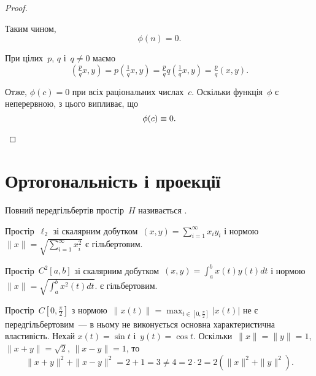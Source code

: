 \begin{proof}
\begin{enumerate}
Таким чином,
\begin{equation*}
    \phi(n) = 0.
\end{equation*}

При цілих~$p$, $q$ і~$q \ne 0$ маємо
\begin{equation*}
    \left( \tfrac{p}{q} x, y \right) =
    p \left( \tfrac{1}{q} x, y \right) =
    \tfrac{p}{q} q \left( \tfrac{1}{q} x, y \right) =
    \tfrac{p}{q} (x, y).
\end{equation*}

Отже, $\phi(c) = 0$ при всіх раціональних числах~$c$. Оскільки
функція~$\phi$ є неперервною, з цього випливає, що
\begin{equation*}
    \phi(c) \equiv 0. \qedhere
\end{equation*}
\end{enumerate}
\end{proof}

\section{Ортогональність і проекції}

\begin{definition}
Повний передгільбертів простір~$H$ називається .
\end{definition}

\begin{example}
Простір~$\ell_2$
зі скалярним добутком~$(x, y) = \sum_{i = 1}^\infty x_i y_i$
і нормою~$\|x\| = \sqrt{\sum_{i = 1}^\infty x_i^2}$
є гільбертовим.
\end{example}

\begin{example}
Простір~$C^2[a, b]$
зі скалярним добутком~$(x, y) = \int_a^b x(t) y(t) dt$
і нормою~$\|x\| = \sqrt{\int_a^b x^2(t) dt}$.
є гільбертовим.
\end{example}

\begin{example}
Простір~$C[0, \frac{\pi}{2}]$
з нормою~$\|x(t)\| = \max_{t \in [0, \frac{\pi}{2}]} |x(t)|$
не є передгільбертовим~--- в ньому не
виконується основна характеристична властивість. Нехай
$x(t) = \sin t$ і~$y(t) = \cos t$. Оскільки~$\|x\| = \|y\| = 1$,
$\|x + y\| = \sqrt{2}$, $\|x - y\| = 1$, то
\begin{equation*}
    \|x + y\|^2 + \|x - y\|^2 = 2 + 1 = 3 \ne
    4 = 2 \cdot 2 = 2 (\|x\|^2 + \|y\|^2).
\end{equation*}
\end{example}

